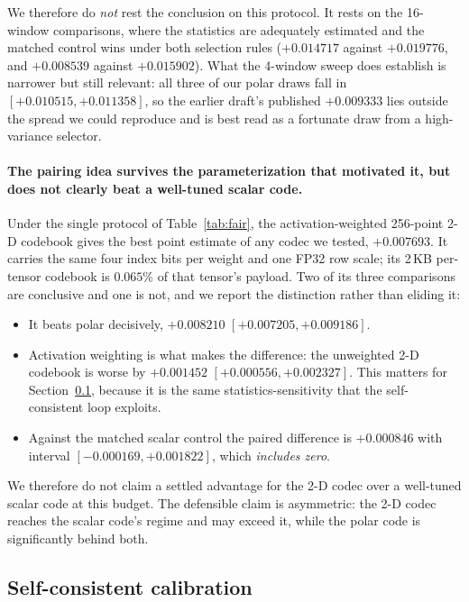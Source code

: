 We therefore do \emph{not} rest the conclusion on this protocol. It rests on
the 16-window comparisons, where the statistics are adequately estimated and the
matched control wins under both selection rules ($+0.014717$ against
$+0.019776$, and $+0.008539$ against $+0.015902$). What the 4-window sweep does
establish is narrower but still relevant: all three of our polar draws fall in
$[+0.010515,+0.011358]$, so the earlier draft's published $+0.009333$ lies
outside the spread we could reproduce and is best read as a fortunate draw from
a high-variance selector.

\paragraph{The pairing idea survives the parameterization that motivated it,
but does not clearly beat a well-tuned scalar code.} Under the single protocol
of Table~\ref{tab:fair}, the activation-weighted 256-point 2-D codebook gives
the best point estimate of any codec we tested, $+0.007693$. It carries the same
four index bits per weight and one FP32 row scale; its 2\,KB per-tensor codebook
is $0.065\%$ of that tensor's payload. Two of its three comparisons are
conclusive and one is not, and we report the distinction rather than eliding it:

\begin{itemize}
\item It beats polar decisively, $+0.008210$ $[+0.007205,+0.009186]$.
\item Activation weighting is what makes the difference: the unweighted 2-D
 codebook is worse by $+0.001452$ $[+0.000556,+0.002327]$. This matters for
 Section~\ref{sec:scffail}, because it is the same statistics-sensitivity that
 the self-consistent loop exploits.
\item Against the matched scalar control the paired difference is $+0.000846$
 with interval $[-0.000169,+0.001822]$, which \emph{includes zero}.
\end{itemize}

We therefore do not claim a settled advantage for the 2-D codec over a
well-tuned scalar code at this budget. The defensible claim is asymmetric: the
2-D codec reaches the scalar code's regime and may exceed it, while the polar
code is significantly behind both.

\subsection{Self-consistent calibration}
\label{sec:scffail}


